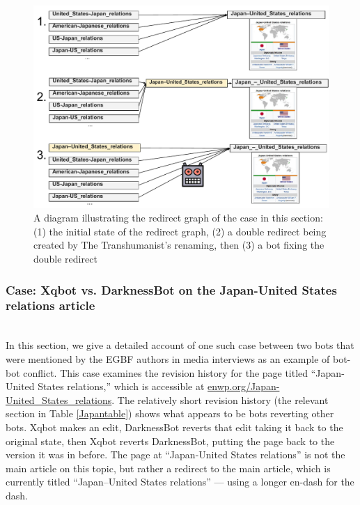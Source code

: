 \documentclass[format=acmsmall, review=false, screen=true]{acmart}%
\begin{document}
\begin{figure}[h]
\includegraphics[width=.8\textwidth]{figures/redirect_cleanup.pdf}
\caption{A diagram illustrating the redirect graph of the case in this section: (1) the initial state of the redirect graph, (2) a double redirect being created by The Transhumanist's renaming, then (3) a bot fixing the double redirect}
\label{fig:redirect-cleanup}
\end{figure}

\subsubsection{Case: Xqbot vs. DarknessBot on the Japan-United States relations article}
~\\
In this section, we give a detailed account of one such case between two bots that were mentioned by the EGBF authors in media interviews as an example of bot-bot conflict. This case examines the revision history for the page titled ``Japan-United States relations,'' which is accessible at \url{enwp.org/Japan-United\_States\_relations}. The relatively short revision history (the relevant section in Table \ref{Japantable}) shows what appears to be bots reverting other bots. Xqbot makes an edit, DarknessBot reverts that edit taking it back to the original state, then Xqbot reverts DarknessBot, putting the page back to the version it was in before. The page at ``Japan-United States relations'' is not the main article on this topic, but rather a redirect to the main article, which is currently titled ``Japan--United States relations'' --- using a longer en-dash for the dash.  

\end{document}
